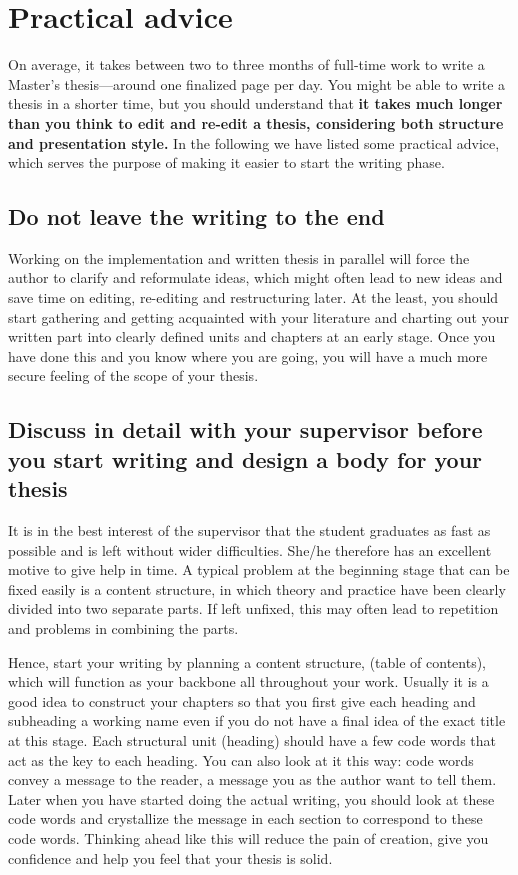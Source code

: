 \section{Practical advice}

On average, it takes between two to three months of full-time work to write a Master’s thesis---around one finalized page per day. You might be able to write a thesis in a shorter time, but you should understand that \textbf{it takes much longer than you think to edit and re-edit a thesis, considering both structure and presentation style.} In the following we have listed some practical advice, which serves the purpose of making it easier to start the writing phase.

\subsection{Do not leave the writing to the end}

Working on the implementation and written thesis in parallel will force the author to clarify and reformulate ideas, which might often lead to new ideas and save time on editing, re-editing and restructuring later. At the least, you should start gathering and getting acquainted with your literature and charting out your written part into clearly defined units and chapters at an early stage. Once you have done this and you know where you are going, you will have a much more secure feeling of the scope of your thesis.

\subsection{Discuss in detail with your supervisor before you start writing and design a
body for your thesis}

It is in the best interest of the supervisor that the student graduates as fast as possible and is left without wider difficulties. She/he therefore has an excellent motive to give help in time. A typical problem at the beginning stage that can be fixed easily is a content structure, in which theory and practice have been clearly divided into two separate parts. If left unfixed, this may often lead to repetition and problems in combining the parts.

Hence, start your writing by planning a content structure, (table of contents), which will function as your backbone all throughout your work. Usually it is a good idea to construct your chapters so that you first give each heading and subheading a working name even if you do not have a final idea of the exact title at this stage. Each structural unit (heading) should have a few code words that act as the key to each heading. You can also look at it this way: code words convey a message to the reader, a message you as the author want to tell them. Later when you have started doing the actual writing, you should look at these code words and crystallize the message in each section to correspond to these code words. Thinking ahead like this will reduce the pain of creation, give you confidence and help you feel that your thesis is solid.

